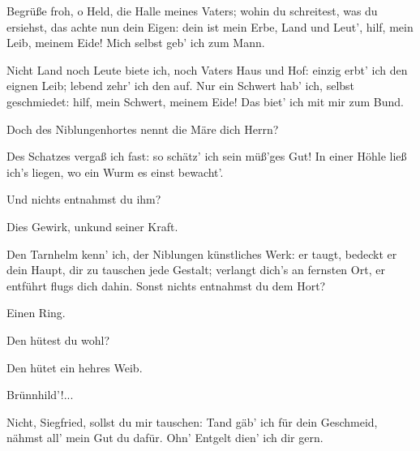 \begin{drama}
\Guntherspeaks

Begrüße froh, o Held,
die Halle meines Vaters;
wohin du schreitest,
was du ersiehst,
das achte nun dein Eigen:
dein ist mein Erbe, Land und Leut',
hilf, mein Leib, meinem Eide!
Mich selbst geb' ich zum Mann.
 

\Siegfriedspeaks

Nicht Land noch Leute biete ich,
noch Vaters Haus und Hof:
einzig erbt' ich den eignen Leib;
lebend zehr' ich den auf.
Nur ein Schwert hab' ich,
selbst geschmiedet:
hilf, mein Schwert, meinem Eide!
Das biet' ich mit mir zum Bund.
 

\Hagenspeaks



Doch des Niblungenhortes
nennt die Märe dich Herrn?
 

\Siegfriedspeaks



Des Schatzes vergaß ich fast:
so schätz' ich sein müß'ges Gut!
In einer Höhle ließ ich's liegen,
wo ein Wurm es einst bewacht'.
 

\Hagenspeaks

Und nichts entnahmst du ihm?
 

\Siegfriedspeaks



Dies Gewirk, unkund seiner Kraft.
 

\Hagenspeaks

Den Tarnhelm kenn' ich,
der Niblungen künstliches Werk:
er taugt, bedeckt er dein Haupt,
dir zu tauschen jede Gestalt;
verlangt dich's an fernsten Ort,
er entführt flugs dich dahin.
Sonst nichts entnahmst du dem Hort?
 

\Siegfriedspeaks

Einen Ring.
 

\Hagenspeaks

Den hütest du wohl?
 

\Siegfriedspeaks

Den hütet ein hehres Weib.
 

\Hagenspeaks



Brünnhild'!...
 

\Guntherspeaks

Nicht, Siegfried, sollst du mir tauschen:
Tand gäb' ich für dein Geschmeid,
nähmst all' mein Gut du dafür.
Ohn' Entgelt dien' ich dir gern.
 



\end{drama}
